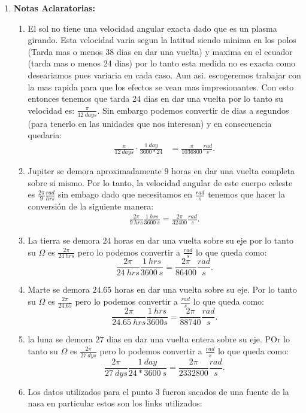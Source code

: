 \begin{enumerate}
    \item \textbf{Notas Aclaratorias: }
      \begin{enumerate}
        \item El sol no tiene una velocidad angular exacta dado que es un plasma girando. Esta velocidad varia segun la latitud siendo minima en los polos (Tarda mas o menos 38 dias en dar una vuelta) y maxima en el ecuador (tarda mas o menos 24 dias) por lo tanto esta medida no es exacta como deseariamos pues variaria en cada caso. Aun asi. escogeremos trabajar con la mas rapida para que los efectos se vean mas impresionantes. Con esto entonces tenemos que tarda 24 dias en dar una vuelta por lo  tanto su velocidad es: $\frac{\pi}{12\ days}$. Sin embargo podemos convertir de dias a segundos (para tenerlo en las unidades que nos interesan) y en consecuencia quedaria:
	  \begin{align*}
	    \frac{\pi}{12\ days}\cdot \frac{1\ day}{3600*24} &= \frac{\pi}{1036800}\frac{rad}{s}
	  .\end{align*}
	\item Jupiter se demora aproximadamente $9$ horas en dar una vuelta completa sobre si mismo. Por lo tanto, la velocidad angular de este cuerpo celeste es $\frac{2\pi}{9}\frac{rad}{hrs}$ sin embago dado que necesitamos en $\frac{rad}{s}$ tenemos que hacer la conversión de la siguiente manera:
	  \begin{align*}
          \frac{2\pi}{9\ hrs}\frac{1\ hrs}{3600\ s} = \frac{2\pi}{32400}\frac{rad}{s}
	  .\end{align*}
	\item La tierra se demora $24$ horas en dar una vuelta sobre su eje por lo tanto su $\Omega$ es $\frac{2\pi}{24\ hrs}$ pero lo podemos convertir a $\frac{rad}{s}$ lo que queda como: \[
	\frac{2\pi}{24\ hrs}\frac{1\ hrs}{3600\ s}=\frac{2\pi}{86400}\frac{rad}{s}
	.\] 
      \item Marte se demora $24.65$ horas en dar una vuelta sobre su eje. Por lo tanto su $\Omega$ es $\frac{2\pi}{24.65}$ pero lo podemos convertir a $\frac{rad}{s}$ lo que queda como: \[
      \frac{2\pi}{24.65\ hrs}\frac{1\ hrs}{3600 s}=\frac{2\pi}{88740}\frac{rad}{s}
      .\] 
    \item la luna se demora $27$ dias en dar una vuelta entera sobre su eje. POr lo tanto su $\Omega$ es $\frac{2\pi}{27\ dys}$ pero lo podemos convertir a $\frac{rad}{s}$ lo que queda como: \[
	\frac{2\pi}{27\ dys}\frac{1\ day}{24*3600\ s}=\frac{2\pi}{2332800}\frac{rad}{s}
    .\] 
  \item Los datos utilizados para el punto 3 fueron sacados de una fuente de la nasa en particular estos son los links utilizados:

\end{enumerate}
\end{enumerate}
